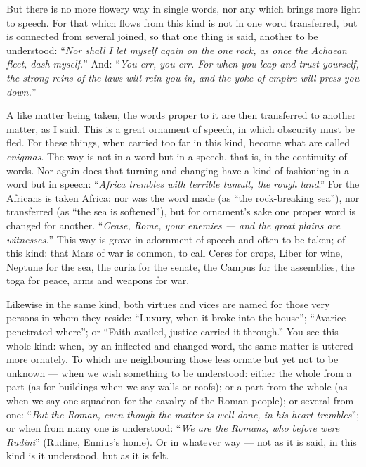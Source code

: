  But there is no more flowery way in single words, nor any which brings more light to speech. For that which flows from this kind is not in one word transferred, but is connected from several joined, so that one thing is said, another to be understood: ``\textit{Nor shall I let myself again on the one rock, as once the Achaean fleet, dash myself.}'' And: ``\textit{You err, you err. For when you leap and trust yourself, the strong reins of the laws will rein you in, and the yoke of empire will press you down.}''

 A like matter being taken, the words proper to it are then transferred to another matter, as I said. This is a great ornament of speech, in which obscurity must be fled. For these things, when carried too far in this kind, become what are called \textit{enigmas}. The way is not in a word but in a speech, that is, in the continuity of words. Nor again does that turning and changing have a kind of fashioning in a word but in speech: ``\textit{Africa trembles with terrible tumult, the rough land}.'' For the Africans is taken Africa: nor was the word made (as ``the rock-breaking sea''), nor transferred (as ``the sea is softened''), but for ornament's sake one proper word is changed for another. ``\textit{Cease, Rome, your enemies — and the great plains are witnesses.}'' This way is grave in adornment of speech and often to be taken; of this kind: that Mars of war is common, to call Ceres for crops, Liber for wine, Neptune for the sea, the curia for the senate, the Campus for the assemblies, the toga for peace, arms and weapons for war.

 Likewise in the same kind, both virtues and vices are named for those very persons in whom they reside: ``Luxury, when it broke into the house''; ``Avarice penetrated where''; or ``Faith availed, justice carried it through.'' You see this whole kind: when, by an inflected and changed word, the same matter is uttered more ornately. To which are neighbouring those less ornate but yet not to be unknown — when we wish something to be understood: either the whole from a part (as for buildings when we say walls or roofs); or a part from the whole (as when we say one squadron for the cavalry of the Roman people); or several from one: ``\textit{But the Roman, even though the matter is well done, in his heart trembles}''; or when from many one is understood: ``\textit{We are the Romans, who before were Rudini}'' (Rudine, Ennius's home). Or in whatever way — not as it is said, in this kind is it understood, but as it is felt.

